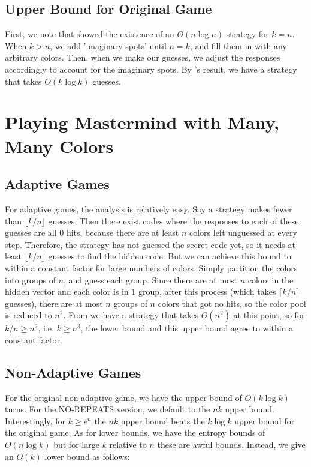 \documentclass[12pt, a4paper]{article}
\begin{document}
\subsection{Upper Bound for Original Game}
First, we note that \cite{DS13} showed the existence of an $O(n \log n)$ strategy for
$k = n$. When $k>n$, we add 'imaginary spots' until $n = k$, and fill them in with any
arbitrary colors. Then, when we make our guesses, we adjust the responses accordingly
to account for the imaginary spots. By \cite{DS13}'s result, we have a strategy that
takes $O(k \log k)$ guesses. 

\section{Playing Mastermind with Many, Many Colors}
\subsection{Adaptive Games}
For adaptive games, the analysis is relatively easy. Say a strategy makes fewer than $\lfloor k/n \rfloor$
guesses. Then there exist codes where the responses to each of these guesses are all 0 hits, 
because there are at least $n$ colors left unguessed at every step. Therefore, the strategy 
has not guessed the secret code yet, so it needs at least $\lfloor k/n \rfloor$ guesses to find the
hidden code. But we can achieve this bound to within a constant factor for large numbers of colors.
Simply partition the colors into groups of $n$, and guess each group. Since there are at most $n$ colors
in the hidden vector and each color is in $1$ group, after this process (which takes $\lceil k/n \rceil$
guesses), there are at most $n$ groups of $n$ colors that got no hits, so the color pool is reduced to
$n^2$. From \cite{DS13} we have a strategy that takes $O(n^2)$ at this point, so for $k/n \geq n^2$, i.e.
$k\ge n^3$, the lower bound and this upper bound agree to within a constant factor.
\subsection{Non-Adaptive Games}
For the original non-adaptive game, we have the upper bound of $O(k \log k)$ turns. For the NO-REPEATS
version, we default to the $nk$ upper bound. Interestingly, for $k \geq e^n$ the $nk$ upper bound beats
the $k \log k$ upper bound for the original game. As for lower bounds, we have the entropy bounds
of $O(n \log k)$ but for large $k$ relative to $n$ these are awful bounds. Instead, we give an $O(k)$
lower bound as follows:
\end{document}
